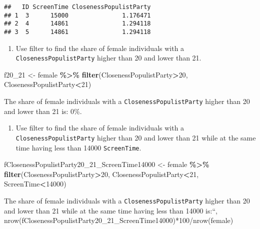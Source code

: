 \documentclass[
]{book}
\newenvironment{Shaded}{\begin{snugshade}}{\end{snugshade}}
\newcommand{\DecValTok}[1]{\textcolor[rgb]{0.00,0.00,0.81}{#1}}
\newcommand{\FunctionTok}[1]{\textcolor[rgb]{0.13,0.29,0.53}{\textbf{#1}}}
\newcommand{\NormalTok}[1]{#1}
\newcommand{\OtherTok}[1]{\textcolor[rgb]{0.56,0.35,0.01}{#1}}
\newcommand{\SpecialCharTok}[1]{\textcolor[rgb]{0.81,0.36,0.00}{\textbf{#1}}}
\providecommand{\tightlist}{%
  \setlength{\itemsep}{0pt}\setlength{\parskip}{0pt}}
\begin{document}
\begin{verbatim}
##   ID ScreenTime ClosenessPopulistParty
## 1  3      15000               1.176471
## 2  4      14861               1.294118
## 3  5      14861               1.294118
\end{verbatim}

\begin{enumerate}
\def\labelenumi{\arabic{enumi}.}
\setcounter{enumi}{5}
\tightlist
\item
  Use filter to find the share of female individuals with a \texttt{ClosenessPopulistParty} higher than 20 and lower than 21.
\end{enumerate}

\begin{Shaded}
\begin{Highlighting}[]
\NormalTok{f20\_21 }\OtherTok{\textless{}{-}}\NormalTok{ female }\SpecialCharTok{\%\textgreater{}\%}
  \FunctionTok{filter}\NormalTok{(ClosenessPopulistParty}\SpecialCharTok{\textgreater{}}\DecValTok{20}\NormalTok{, ClosenessPopulistParty}\SpecialCharTok{\textless{}}\DecValTok{21}\NormalTok{)}
\end{Highlighting}
\end{Shaded}

The share of female individuals with a \texttt{ClosenessPopulistParty} higher than 20 and lower than 21 is: 0\%.

\begin{enumerate}
\def\labelenumi{\arabic{enumi}.}
\setcounter{enumi}{6}
\tightlist
\item
  Use filter to find the share of female individuals with a \texttt{ClosenessPopulistParty} higher than 20 and lower than 21 while at the same time having less than 14000 \texttt{ScreenTime}.
\end{enumerate}

\begin{Shaded}
\begin{Highlighting}[]
\NormalTok{fClosenessPopulistParty20\_21\_ScreenTime14000 }\OtherTok{\textless{}{-}}\NormalTok{ female }\SpecialCharTok{\%\textgreater{}\%}
  \FunctionTok{filter}\NormalTok{(ClosenessPopulistParty}\SpecialCharTok{\textgreater{}}\DecValTok{20}\NormalTok{, ClosenessPopulistParty}\SpecialCharTok{\textless{}}\DecValTok{21}\NormalTok{, ScreenTime}\SpecialCharTok{\textless{}}\DecValTok{14000}\NormalTok{)}
\end{Highlighting}
\end{Shaded}

The share of female individuals with a \texttt{ClosenessPopulistParty} higher than 20 and lower than 21 while at the same time having less than 14000 is:``, nrow(fClosenessPopulistParty20\_21\_ScreenTime14000)*100/nrow(female)
\end{document}
